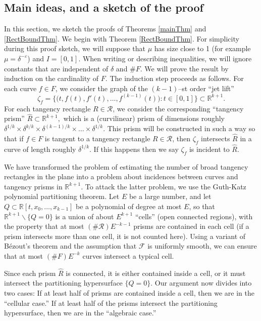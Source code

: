 \documentclass[letterpaper, reqno,11pt]{article}
\numberwithin{equation}{section}
\newcommand{\RR}{\mathbb{R}}
\newcommand{\eps}{\varepsilon}
\numberwithin{thm}{section}
\theoremstyle{remark}
\begin{document}
\subsection{Main ideas, and a sketch of the proof}\label{introProofSketch}
In this section, we sketch the proofs of Theorems \ref{mainThm} and \ref{RectBoundThm}. We begin with Theorem \ref{RectBoundThm}. For simplicity during this proof sketch, we will suppose that $\mu$ has size close to 1 (for example $\mu = \delta^{-\eps}$) and $I=[0,1]$. When writing or describing inequalities, we will ignore constants that are independent of $\delta$ and $\#F$. We will prove the result by induction on the cardinality of $F$.
%
The induction step proceeds as follows. For each curve $f\in F$, we consider the graph of the $(k-1)$--st order ``jet lift'' 
\[
\zeta_f = \big\{\big(t, f(t), f'(t), \ldots, f^{(k-1)}(t)\big)\colon t\in [0,1]\big\}\subset\RR^{k+1}.
\] 
For each tangency rectangle $R\in\mathcal{R}$, we consider the corresponding ``tangency prism'' $\hat R\subset \RR^{k+1},$ which is a (curvilinear) prism of dimensions roughly $\delta^{1/k}\times \delta^{k/k}\times\delta^{(k-1)/k}\times\ldots\times\delta^{1/k}$. This prism will be constructed in such a way so that if $f\in F$ is tangent to a tangency rectangle $R\in \mathcal{R}$, then $\zeta_f$ intersects $\hat R$ in a curve of length roughly $\delta^{1/k}$. If this happens then we say $\zeta_f$ is incident to $\hat R$.

We have transformed the problem of estimating the number of broad tangency rectangles in the plane into a problem about incidences between curves and tangency prisms in $\RR^{k+1}$. To attack the latter problem, we use the Guth-Katz polynomial partitioning theorem. Let $E$ be a large number, and let $Q\subset\RR[t, x_0,\ldots,x_{k-1}]$ be a polynomial of degree at most $E$, so that $\RR^{k+1}\backslash\{Q=0\}$ is a union of about $E^{k+1}$ ``cells'' (open connected regions), with the property that at most $(\#\mathcal{R}) E^{-k-1}$ prisms are contained in each cell (if a prism intersects more than one cell, it is not counted here). Using a variant of B\'ezout's theorem and the assumption that $\mathcal{F}$ is uniformly smooth, we can ensure that at most $(\#F) E^{-k}$ curves intersect a typical cell. 

Since each prism $\hat R$ is connected, it is either contained inside a cell, or it must intersect the partitioning hypersurface $\{Q=0\}$. Our argument now divides into two cases: If at least half of prisms are contained inside a cell, then we are in the ``cellular case.'' If at least half of the prisms intersect the partitioning hypersurface, then we are in the ``algebraic case.''
\end{document}

